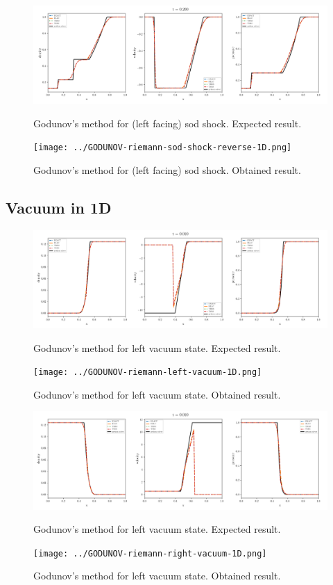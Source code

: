 \begin{figure}[htbp]
    \centering
	\includegraphics[width=.9\textwidth]{./figures/GODUNOV-riemann-sod-shock-reverse-1D.png}%
	\caption{Godunov's method for (left facing) sod shock. Expected result.}
	\texttt{[image: ../GODUNOV-riemann-sod-shock-reverse-1D.png]}%
	\caption{Godunov's method for (left facing) sod shock. Obtained result.}
\end{figure}










\clearpage
\subsection{Vacuum in 1D}

\begin{figure}[htbp]
    \centering
	\includegraphics[width=.9\textwidth]{./figures/GODUNOV-riemann-left-vacuum-1D.png}%
	\caption{Godunov's method for left vacuum state. Expected result.}
	\texttt{[image: ../GODUNOV-riemann-left-vacuum-1D.png]}
	\caption{Godunov's method for left vacuum state. Obtained result.}
\end{figure}


\begin{figure}[htbp]
    \centering
	\includegraphics[width=.9\textwidth]{./figures/GODUNOV-riemann-right-vacuum-1D.png}%
	\caption{Godunov's method for left vacuum state. Expected result.}
	\texttt{[image: ../GODUNOV-riemann-right-vacuum-1D.png]}
	\caption{Godunov's method for left vacuum state. Obtained result.}
\end{figure}


